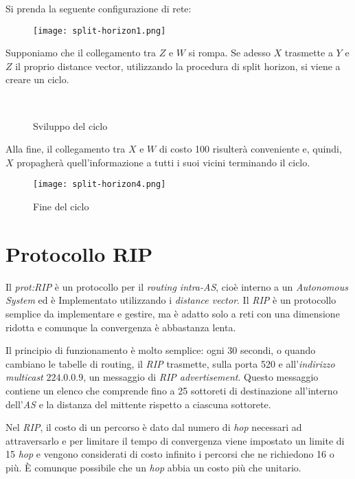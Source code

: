 \begin{eg}
Si prenda la seguente configurazione di rete:

\begin{figure}[h!]
    \centering
    \texttt{[image: split-horizon1.png]}
\end{figure}\noindent
Supponiamo che il collegamento tra $Z$ e $W$ si rompa. Se adesso $X$ trasmette
a $Y$ e $Z$ il proprio distance vector, utilizzando la procedura di
split horizon, si viene a creare un ciclo.
\newpage
\begin{figure}[ht!]
    \centering
    \\
    \caption{Sviluppo del ciclo}
\end{figure}\noindent
Alla fine, il collegamento tra $X$ e $W$ di costo 100 risulterà conveniente
e, quindi, $X$ propagherà quell'informazione a tutti i suoi vicini terminando il
ciclo.

\begin{figure}[h!]
    \centering
    \texttt{[image: split-horizon4.png]}
    \caption{Fine del ciclo}
\end{figure}
\end{eg}

\section{Protocollo RIP}
Il \emph{\gls{prot:RIP}} è un protocollo per il \emph{routing intra-AS}, cioè
interno a un \emph{Autonomous System} ed è Implementato utilizzando i
\emph{distance vector}. Il \emph{RIP} è un protocollo semplice da implementare e
gestire, ma è adatto solo a reti con una dimensione ridotta e comunque la
convergenza è abbastanza lenta.

Il principio di funzionamento è molto semplice: ogni 30 secondi, o quando cambiano
le tabelle di routing, il \emph{RIP} trasmette, sulla porta 520 e
all'\emph{indirizzo multicast} $224.0.0.9$, un messaggio di \emph{RIP advertisement}.
Questo messaggio contiene un elenco che comprende fino a 25 sottoreti di
destinazione all'interno dell'\emph{AS} e la distanza del mittente rispetto a
ciascuna sottorete.

Nel \emph{RIP}, il costo di un percorso è dato dal numero di \emph{hop} necessari
ad attraversarlo e per limitare il tempo di convergenza viene impostato un limite
di 15 \emph{hop} e vengono considerati di costo infinito i percorsi che ne
richiedono 16 o più. È comunque possibile che un \emph{hop} abbia un costo più
che unitario.

